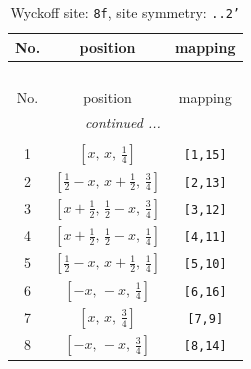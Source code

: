 \documentclass[fleqn,8pt]{jsarticle}
\begin{document}
\begin{longtable}{ccc}
\caption{Wyckoff site: {\tt 8f}, site symmetry: {\tt ..2'}}
 \\
 \hline \hline
No. & position & mapping \\ \hline \endfirsthead

\multicolumn{2}{l}{\tablename\ \thetable{}} \\
 \hline \hline
No. & position & mapping \\ \hline \endhead

 \hline \hline
\multicolumn{2}{r}{\footnotesize\it continued ...} \\ \endfoot

 \hline \hline
\multicolumn{2}{r}{} \\ \endlastfoot

1 & $\left[ x,\, x,\, \frac{1}{4} \right]$ & {\tt [1,15]} \\ \hline
2 & $\left[ \frac{1}{2} - x,\, x + \frac{1}{2},\, \frac{3}{4} \right]$ & {\tt [2,13]} \\ \hline
3 & $\left[ x + \frac{1}{2},\, \frac{1}{2} - x,\, \frac{3}{4} \right]$ & {\tt [3,12]} \\ \hline
4 & $\left[ x + \frac{1}{2},\, \frac{1}{2} - x,\, \frac{1}{4} \right]$ & {\tt [4,11]} \\ \hline
5 & $\left[ \frac{1}{2} - x,\, x + \frac{1}{2},\, \frac{1}{4} \right]$ & {\tt [5,10]} \\ \hline
6 & $\left[ - x,\, - x,\, \frac{1}{4} \right]$ & {\tt [6,16]} \\ \hline
7 & $\left[ x,\, x,\, \frac{3}{4} \right]$ & {\tt [7,9]} \\ \hline
8 & $\left[ - x,\, - x,\, \frac{3}{4} \right]$ & {\tt [8,14]} \\
\end{longtable}
\renewcommand{\arraystretch}{1.2}
\end{document}
